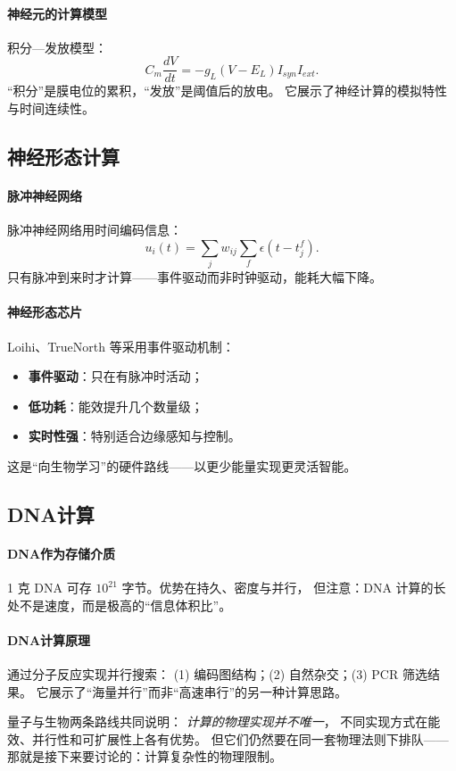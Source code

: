 \paragraph{神经元的计算模型}
积分—发放模型：
$$C_m\dfrac{dV}{dt}=-g_L(V-E_L)I_{syn}I_{ext}.$$
“积分”是膜电位的累积，“发放”是阈值后的放电。  
它展示了神经计算的模拟特性与时间连续性。

\subsection{神经形态计算}

\paragraph{脉冲神经网络}
脉冲神经网络用时间编码信息：
$$u_i(t)=\sum_jw_{ij}\sum_f\epsilon(t-t_j^f).$$
只有脉冲到来时才计算——事件驱动而非时钟驱动，能耗大幅下降。

\paragraph{神经形态芯片}
Loihi、TrueNorth 等采用事件驱动机制：  
\begin{itemize}
\item \textbf{事件驱动}：只在有脉冲时活动；
\item \textbf{低功耗}：能效提升几个数量级；
\item \textbf{实时性强}：特别适合边缘感知与控制。
\end{itemize}
这是“向生物学习”的硬件路线——以更少能量实现更灵活智能。

\subsection{DNA计算}

\paragraph{DNA作为存储介质}
1 克 DNA 可存 $10^{21}$ 字节。优势在持久、密度与并行，  
但注意：DNA 计算的长处不是速度，而是极高的“信息体积比”。

\paragraph{DNA计算原理}
通过分子反应实现并行搜索：  
(1) 编码图结构；(2) 自然杂交；(3) PCR 筛选结果。  
它展示了“海量并行”而非“高速串行”的另一种计算思路。

量子与生物两条路线共同说明：  
\emph{计算的物理实现并不唯一}，  
不同实现方式在能效、并行性和可扩展性上各有优势。  
但它们仍然要在同一套物理法则下排队——  
那就是接下来要讨论的：计算复杂性的物理限制。

